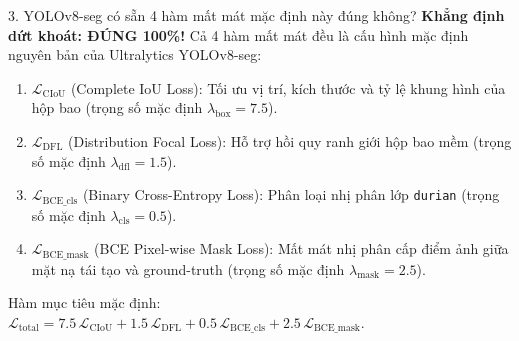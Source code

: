 \documentclass[11pt,a4paper]{article}
\begin{document}
\vspace{6pt}

\begin{qbox}{3. YOLOv8-seg có sẵn 4 hàm mất mát mặc định này đúng không?}
\textbf{Khẳng định dứt khoát: ĐÚNG 100\%!}
Cả 4 hàm mất mát đều là cấu hình mặc định nguyên bản của Ultralytics YOLOv8-seg:
\begin{enumerate}[leftmargin=1.5em]
    \item $\mathcal{L}_{\text{CIoU}}$ (Complete IoU Loss): Tối ưu vị trí, kích thước và tỷ lệ khung hình của hộp bao (trọng số mặc định $\lambda_{\text{box}} = 7.5$).
    \item $\mathcal{L}_{\text{DFL}}$ (Distribution Focal Loss): Hỗ trợ hồi quy ranh giới hộp bao mềm (trọng số mặc định $\lambda_{\text{dfl}} = 1.5$).
    \item $\mathcal{L}_{\text{BCE\_cls}}$ (Binary Cross-Entropy Loss): Phân loại nhị phân lớp \texttt{durian} (trọng số mặc định $\lambda_{\text{cls}} = 0.5$).
    \item $\mathcal{L}_{\text{BCE\_mask}}$ (BCE Pixel-wise Mask Loss): Mất mát nhị phân cấp điểm ảnh giữa mặt nạ tái tạo và ground-truth (trọng số mặc định $\lambda_{\text{mask}} = 2.5$).
\end{enumerate}
Hàm mục tiêu mặc định: $\mathcal{L}_{\text{total}} = 7.5\,\mathcal{L}_{\text{CIoU}} + 1.5\,\mathcal{L}_{\text{DFL}} + 0.5\,\mathcal{L}_{\text{BCE\_cls}} + 2.5\,\mathcal{L}_{\text{BCE\_mask}}$.
\end{qbox}

\vspace{6pt}
\end{document}
